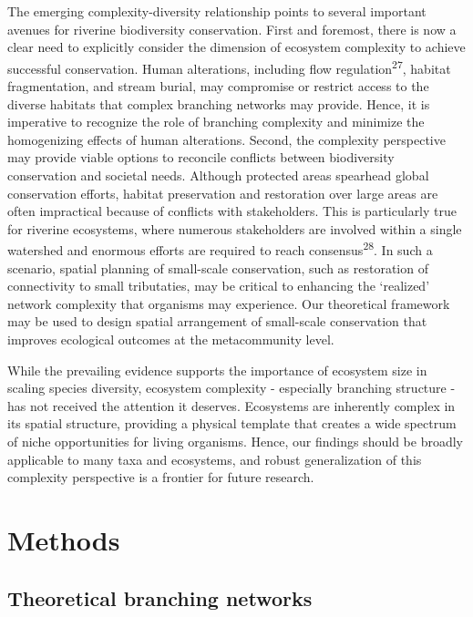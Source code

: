 \documentclass[
]{article}
\begin{document}
The emerging complexity-diversity relationship points to several
important avenues for riverine biodiversity conservation. First and
foremost, there is now a clear need to explicitly consider the dimension
of ecosystem complexity to achieve successful conservation. Human
alterations, including flow regulation\textsuperscript{27}, habitat
fragmentation, and stream burial, may compromise or restrict access to
the diverse habitats that complex branching networks may provide. Hence,
it is imperative to recognize the role of branching complexity and
minimize the homogenizing effects of human alterations. Second, the
complexity perspective may provide viable options to reconcile conflicts
between biodiversity conservation and societal needs. Although protected
areas spearhead global conservation efforts, habitat preservation and
restoration over large areas are often impractical because of conflicts
with stakeholders. This is particularly true for riverine ecosystems,
where numerous stakeholders are involved within a single watershed and
enormous efforts are required to reach consensus\textsuperscript{28}. In
such a scenario, spatial planning of small-scale conservation, such as
restoration of connectivity to small tributaties, may be critical to
enhancing the `realized' network complexity that organisms may
experience. Our theoretical framework may be used to design spatial
arrangement of small-scale conservation that improves ecological
outcomes at the metacommunity level.

While the prevailing evidence supports the importance of ecosystem size
in scaling species diversity, ecosystem complexity - especially
branching structure - has not received the attention it deserves.
Ecosystems are inherently complex in its spatial structure, providing a
physical template that creates a wide spectrum of niche opportunities
for living organisms. Hence, our findings should be broadly applicable
to many taxa and ecosystems, and robust generalization of this
complexity perspective is a frontier for future research.

\hypertarget{methods}{%
\section{Methods}\label{methods}}

\hypertarget{theoretical-branching-networks}{%
\subsection{Theoretical branching
networks}\label{theoretical-branching-networks}}
\end{document}
